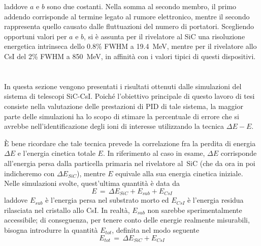 laddove $a$ e $b$ sono due costanti.
Nella somma al secondo membro, il primo addendo corrisponde al termine legato al rumore elettronico, mentre il secondo rappresenta quello causato dalle fluttuazioni del numero di portatori.
%
%
Scegliendo opportuni valori per $a$ e $b$, si è assunta per il rivelatore al SiC una risoluzione energetica intrinseca dello 0.8\% FWHM a 19.4~MeV, mentre per il rivelatore allo CsI del 2\% FWHM a 850~MeV, in affinità con i valori tipici di questi dispositivi. 









\section{}

In questa sezione vengono presentati i risultati ottenuti dalle simulazioni \geant{} del sistema di telescopi SiC-CsI.
Poiché l'obiettivo principale di questo lavoro di tesi consiste nella valutazione delle prestazioni di PID di tale sistema, la maggior parte delle simulazioni ha lo scopo di stimare la percentuale di errore che si avrebbe nell'identificazione degli ioni di interesse utilizzando la tecnica $\Delta E - E$.

È bene ricordare che tale tecnica prevede la correlazione fra la perdita di energia $\Delta E$ e l'energia cinetica totale $E$. In riferimento al caso in esame, $\Delta E$ corrisponde all'energia persa dalla particella primaria nel rivelatore al~SiC (che da ora in poi indicheremo con $ \Delta E_{SiC}$), mentre $E$ equivale alla sua energia cinetica iniziale. Nelle simulazioni svolte, quest'ultima quantità è data da
\begin{equation}
	E \, = \, \Delta E_{SiC} + E_{sub} + E_{CsI}
\end{equation}
laddove $E_{sub}$ è l'energia persa nel substrato morto ed $E_{CsI}$ è l'energia residua rilasciata nel cristallo allo CsI.
In realtà, $E_{sub}$ non sarebbe sperimentalmente accessibile; di conseguenza, per tenere conto delle energie realmente misurabili, bisogna introdurre la quantità $E_{tot}$, definita nel modo seguente
\begin{equation}
	E_{tot} \, = \, \Delta E_{SiC} + E_{CsI}
\end{equation}

